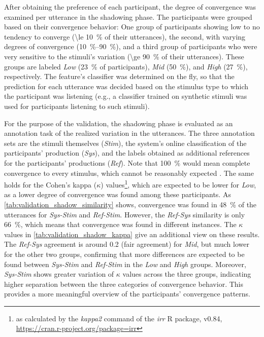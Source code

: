 After obtaining the preference of each participant, the degree of convergence was examined per utterance in the shadowing phase.
The participants were grouped based on their convergence behavior:
One group of participants showing low to no tendency to converge (\SI{\le 10}{\percent} of their utterances),
the second, with varying degrees of convergence (\SIrange{10}{90}{\percent}),
and a third group of participants who were very sensitive to the stimuli's variation (\SI{\ge 90}{\percent} of their utterances).
These groups are labeled \emph{Low} (\SI{23}{\percent} of participants), \emph{Mid} (\SI{50}{\percent}), and \emph{High} (\SI{27}{\percent}), respectively.
The feature's classifier was determined on the fly, so that the prediction for each utterance was decided based on the stimulus type to which the participant was listening (e.g., a classifier trained on synthetic stimuli was used for participants listening to such stimuli).

For the purpose of the validation, the shadowing phase is evaluated as an annotation task of the realized variation in the utterances.
The three annotation sets are the stimuli themselves (\emph{Stim}), the system's online classification of the participants' production (\emph{Sys}), and the labels obtained as additional references for the participants' productions (\emph{Ref}).
Note that \SI{100}{\percent} would mean complete convergence to every stimulus, which cannot be reasonably expected \citep[cf.][]{Gessinger2017Interspeech}.
The same holds for the Cohen's kappa ($\kappa$) values\footnote{as calculated by the \emph{kappa2} command of the \emph{irr} R package, v0.84, \url{https://cran.r-project.org/package=irr}}, which are expected to be lower for \emph{Low}, as a lower degree of convergence was found among these participants.
As \cref{tab:validation_shadow_similarity} shows, convergence was found in \SI{48}{\percent} of the utterances for \emph{Sys-Stim} and \emph{Ref-Stim}.
However, the \emph{Ref-Sys} similarity is only \SI{66}{\percent}, which means that convergence was found in different instances.
The $\kappa$ values in \cref{tab:validation_shadow_kappa} give an additional view on these results.
The \emph{Ref-Sys} agreement is around 0.2 (fair agreement) for \emph{Mid}, but much lower for the other two groups,
confirming that more differences are expected to be found between \emph{Sys-Stim} and \emph{Ref-Stim} in the \emph{Low} and \emph{High} groups.
Moreover, \emph{Sys-Stim} shows greater variation of $\kappa$ values across the three groups, indicating higher separation between the three categories of convergence behavior.
This provides a more meaningful overview of the participants' convergence patterns.

